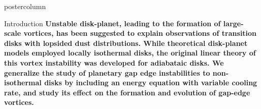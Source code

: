 \documentclass[final,hyperref={pdfpagelabels=false}]{beamer}
\newlength{\columnheight}
\begin{document}
\begin{frame}
\begin{columns}

    \begin{column}{.49\textwidth}
      \begin{beamercolorbox}[center,wd=\textwidth]{postercolumn}
        \begin{minipage}[T]{.95\textwidth}  %
          \parbox[t][\columnheight]{\textwidth}{ %
            \begin{block}{{\Large Introduction}}
              \justifying
                  {\large              
                    {\bf
                      Unstable disk-planet, leading to the
                      formation of large-scale vortices, has been
                      suggested to explain observations of transition
                      disks with lopsided dust
                      distributions. While theoretical disk-planet
                      models employed locally isothermal disks, 
                      the original linear theory of this vortex
                      instability was developed for adiabataic disks. We
                      generalize the study of planetary gap edge
                      instabilities to non-isothermal disks by
                      including an energy equation with variable
                      cooling rate, and study its effect on the
                      formation and evolution of gap-edge vortices. 
                    }
                  }
            \end{block}
            \vfill
             
}
\end{minipage}
\end{beamercolorbox}
\end{column}
\end{columns}
\end{frame}
\end{document}
